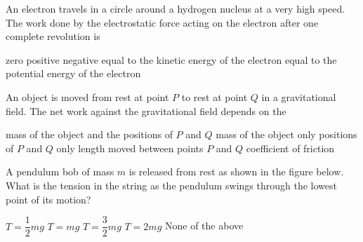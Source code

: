 \documentclass{../../../oss-classkick-exam}
\begin{document}
\begin{multicols*}{2}
\begin{questions}
    \question An electron travels in a circle around a hydrogen nucleus at a
    very high speed. The work done by the electrostatic force acting on the
    electron after one complete revolution is
    \begin{choices}
      \choice zero
      \choice positive
      \choice negative
      \choice equal to the kinetic energy of the electron
      \choice equal to the potential energy of the electron
    \end{choices}
    \vspace{.7in}
    
    \question An object is moved from rest at point $P$ to rest at point $Q$ in
    a gravitational field. The net work against the gravitational field depends
    on the
    \begin{choices}
      \choice mass of the object and the positions of $P$ and $Q$
      \choice mass of the object only
      \choice positions of $P$ and $Q$ only
      \choice length moved between points $P$ and $Q$
      \choice coefficient of friction
    \end{choices}

    \question A pendulum bob of mass $m$ is released from rest as shown in the
    figure below. What is the tension in the string as the pendulum swings
    through the lowest point of its motion?
    \begin{center}
    \end{center}
    \begin{choices}
      \choice $T=\dfrac12mg$
      \choice $T=mg$
      \choice $T=\dfrac32mg$
      \choice $T=2mg$
      \choice None of the above
    \end{choices}
    \columnbreak
    


\end{questions}
\end{multicols*}
\end{document}
